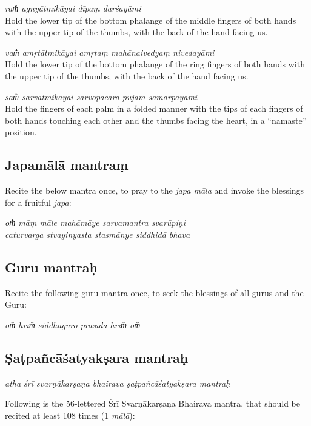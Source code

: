 \documentclass[12pt,oneside,a4paper]{article}
\newenvironment{shloka}[1]
  {\bigskip\center#1\varwidth{\linewidth}}
  {\endvarwidth\endcenter\bigskip}
\newcommand{\tl}[1]{\emph{#1}}
\begin{document}
\tl{ram̐ agnyātmikāyai dīpaṃ darśayāmi}\\
Hold the lower tip of the bottom phalange of the middle fingers of both hands
with the upper tip of the thumbs, with the back of the hand facing us.

\tl{vam̐ amṛtātmikāyai amṛtaṃ mahānaivedyaṃ nivedayāmi}\\
Hold the lower tip of the bottom phalange of the ring fingers of both hands with
the upper tip of the thumbs, with the back of the hand facing us.

\tl{sam̐ sarvātmikāyai sarvopacāra pūjām samarpayāmi}\\
Hold the fingers of each palm in a folded manner with the tips of each fingers
of both hands touching each other and the thumbs facing the heart, in
a ``namaste'' position.

\subsection{Japamālā mantraṃ}

Recite the below mantra once, to pray to the \tl{japa māla} and invoke
the blessings for a fruitful \tl{japa}:

\begin{shloka}\itshape
  om̐ māṃ māle mahāmāye sarvamantra svarūpiṇi\\
  caturvarga stvayinyasta stasmānye siddhidā bhava
\end{shloka}

\subsection{Guru mantraḥ}

Recite the following guru mantra once, to seek the blessings of all gurus and
the Guru:

\begin{shloka}\itshape
  om̐ hrīm̐ siddhaguro prasīda hrīm̐ om̐
\end{shloka}

\subsection{Ṣaṭpañcāśatyakṣara mantraḥ}

\begin{shloka}\itshape
  atha śrī svarṇākarṣaṇa bhairava ṣaṭpañcāśatyakṣara mantraḥ
\end{shloka}

Following is the 56-lettered Śrī Svarṇākarṣaṇa Bhairava mantra, that should be
recited at least 108 times (1 \tl{mālā}):
\end{document}
